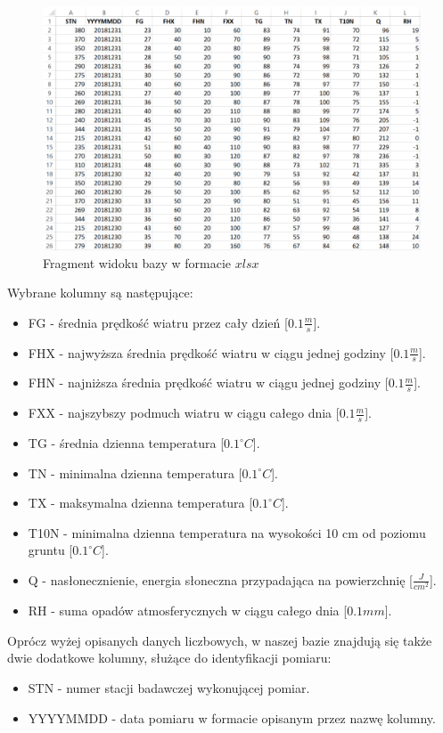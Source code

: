 \documentclass{classrep}
\begin{document}
\begin{figure}[H]
	\centering
	\includegraphics[width=\textwidth]{Pictures/baza.png}
	\caption{Fragment widoku bazy w formacie $xlsx$}
\end{figure}

Wybrane kolumny są następujące:
\begin{itemize}[label=$\bullet$\scshape\bfseries]
\item FG - średnia prędkość wiatru przez cały dzień [$0.1 \frac{m}{s}$].
\item FHX - najwyższa średnia prędkość wiatru w ciągu jednej godziny [$0.1 \frac{m}{s}$].
\item FHN - najniższa średnia prędkość wiatru w ciągu jednej godziny [$0.1 \frac{m}{s}$].
\item FXX - najszybszy podmuch wiatru w ciągu całego dnia [$0.1 \frac{m}{s}$].
\item TG - średnia dzienna temperatura [$0.1^{\circ} C$].
\item TN - minimalna dzienna temperatura [$0.1^{\circ} C$].
\item TX - maksymalna dzienna temperatura [$0.1^{\circ} C$].
\item T10N - minimalna dzienna temperatura na wysokości 10 cm od poziomu gruntu [$0.1^{\circ} C$].
\item Q - nasłonecznienie, energia słoneczna przypadająca na powierzchnię [$\frac{J}{cm^2}$].
\item RH - suma opadów atmosferycznych w ciągu całego dnia [$0.1 mm$].\newline
\end{itemize}

Oprócz wyżej opisanych danych liczbowych, w naszej bazie znajdują się także dwie dodatkowe kolumny, służące do identyfikacji pomiaru:
\begin{itemize}[label=$\bullet$\scshape\bfseries]
\item STN - numer stacji badawczej wykonującej pomiar.
\item YYYYMMDD - data pomiaru w formacie opisanym przez nazwę kolumny.
\end{itemize}
\end{document}
